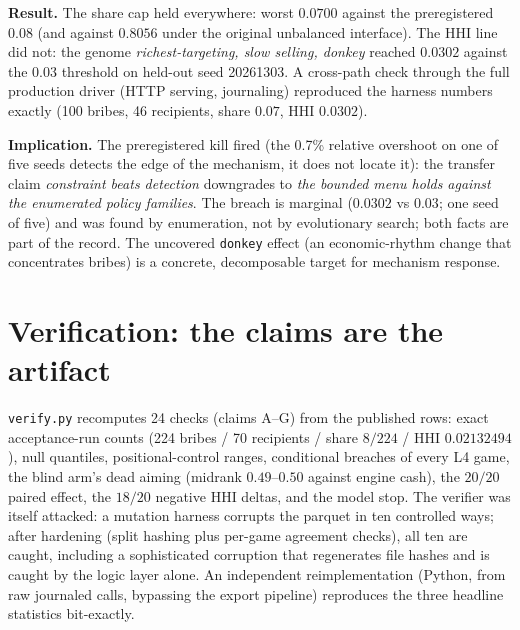 \documentclass[11pt]{article}
\begin{document}
\textbf{Result.} The share cap held everywhere: worst $0.0700$ against the preregistered
$0.08$ (and against $0.8056$ under the original unbalanced interface). The HHI line did
not: the genome \emph{richest-targeting, slow selling, donkey} reached $0.0302$ against
the $0.03$ threshold on held-out seed 20261303. A cross-path check through the full
production driver (HTTP serving, journaling) reproduced the harness numbers exactly
(100 bribes, 46 recipients, share $0.07$, HHI $0.0302$).

\textbf{Implication.} The preregistered kill fired (the 0.7\% relative overshoot on one of five
seeds detects the edge of the mechanism, it does not locate it): the transfer
claim \emph{constraint
beats detection} downgrades to \emph{the bounded menu holds against the enumerated policy
families}. The breach is marginal ($0.0302$ vs $0.03$; one seed of five) and was found by
enumeration, not by evolutionary search; both facts are part of the record. The uncovered
\texttt{donkey} effect (an economic-rhythm change that concentrates bribes) is a concrete,
decomposable target for mechanism response.

\section{Verification: the claims are the artifact}

\texttt{verify.py} recomputes 24 checks (claims A--G) from the published rows: exact
acceptance-run counts (224 bribes / 70 recipients / share $8/224$ / HHI $0.02132494$),
null quantiles, positional-control ranges, conditional breaches of every L4 game, the
blind arm's dead aiming (midrank $0.49$--$0.50$ against engine cash), the $20/20$ paired
effect, the $18/20$ negative HHI deltas, and the model stop. The verifier was itself
attacked: a mutation harness corrupts the parquet in ten controlled ways; after hardening
(split hashing plus per-game agreement checks), all ten are caught, including a
sophisticated corruption that regenerates file hashes and is caught by the logic layer
alone. An independent reimplementation (Python, from raw journaled calls, bypassing the
export pipeline) reproduces the three headline statistics bit-exactly.
\end{document}
